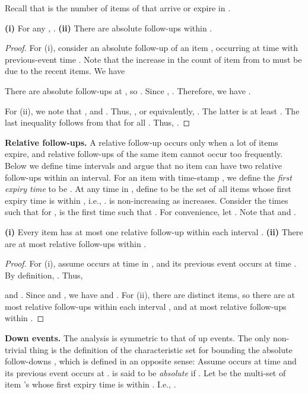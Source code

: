 \documentclass[proceedings]{stacs}
\theoremstyle{definition}\newtheorem{fact}{Fact}
\begin{document}
 {Recall that  is the number of items of 
  that arrive or expire in .}

\begin{lemma} \label{lem:fi-step-up-s-simple}
{\bf (i)} For any , .
{\bf (ii)} There are 
absolute follow-ups within .
\end{lemma}

\begin{proof}
For (i), consider an absolute follow-up  of an item ,
occurring at time  with previous-event time .
Note that the increase in the count of item  from  to  must be due to the recent
items. We have

There are  absolute follow-ups at ,
so .
Since ,
.
Therefore, we have .


For (ii), we note that ,
and .
Thus, ,
or equivalently, .
The latter is at least
.
The last inequality follows from that  for all .
Thus, .
\end{proof}

{\bf Relative follow-ups.}
A relative follow-up occurs only when a lot of items expire,
and relative follow-ups of the same item cannot occur
too frequently. Below we define  time intervals
and argue that no item can have two relative follow-ups within
an interval.
For an item with time-stamp ,
we define the \emph{first expiry time} to be .
At any time  in , define 
to be the set of all items whose
first expiry time is within ,
i.e., .
 is non-increasing as  increases.
Consider the times 
such that for ,  is the first time
such that .
For convenience, let .
Note that  and .


\begin{lemma}\label{lem:fi-type2-up}
{\bf (i)} Every item  has at most one relative follow-up 
within each interval .
{\bf (ii)} There are at most 
relative follow-ups within .
\end{lemma}
\begin{proof}
For (i), assume  occurs at time  in , and its previous event
occurs at time .
By definition, . Thus,

and .
Since   and ,
we have  and .
For (ii), there are  distinct items, so there
are at most  relative follow-ups
within each interval ,
and  at most  relative follow-ups within .
\end{proof}

{\bf Down events.} The analysis is symmetric to that
of up events. The only non-trivial thing is the definition of the
characteristic set for
bounding the absolute follow-downs , which
is defined in an opposite sense:
Assume  occurs at time  and its  previous event occurs at .
 is said to be {\em absolute}
if .
Let  be
the multi-set of item 's whose first expiry time is within
. I.e., .
\end{document}
